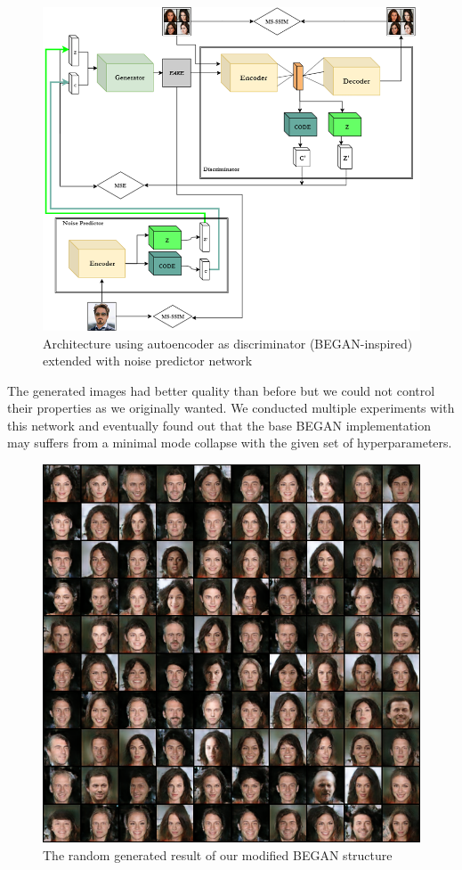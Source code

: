 \documentclass{egpubl}
\begin{document}
\begin{figure}[!htb]
	\centering
	\includegraphics[width=\linewidth]{pic/BInfoGAN+predictor}
	\caption{Architecture using autoencoder as discriminator (BEGAN-inspired) extended with noise predictor network}
	\label{fig:infogan_ae_noise}
\end{figure}

The generated images had better quality than before but we could not control their properties as we originally wanted. We conducted multiple experiments with this network and eventually found out that the base BEGAN implementation may suffers from a minimal mode collapse with the given set of hyperparameters.

\begin{figure}[!htb]
	\centering
	\includegraphics[width=\linewidth]{pic/InfoBegan_random_result}
	\caption{The random generated result of our modified BEGAN structure}
	
\end{figure}
\end{document}
